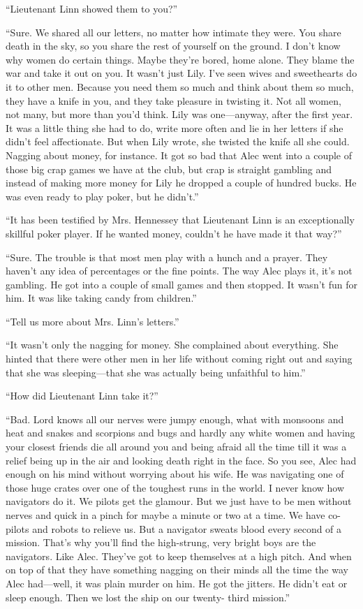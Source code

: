 \documentclass{novel}
\begin{document}
“Lieutenant Linn showed them to you?”

“Sure. We shared all our letters, no matter how intimate they were. You share death in the sky, so you share the rest of yourself on the ground. I don’t know why women do certain things. Maybe they’re bored, home alone. They blame the war and take it out on you. It wasn’t just Lily. I’ve seen wives and sweethearts do it to other men. Because you need them so much and think about them so much, they have a knife in you, and they take pleasure in twisting it. Not all women, not many, but more than you’d think. Lily was one—anyway, after the first year. It was a little thing she had to do, write more often and lie in her letters if she didn’t feel affectionate. But when Lily wrote, she twisted the knife all she could. Nagging about money, for instance. It got so bad that Alec went into a couple of those big crap games we have at the club, but crap is straight gambling and instead of making more money for Lily he dropped a couple of hundred bucks. He was even ready to play poker, but he didn’t.”

“It has been testified by Mrs. Hennessey that Lieutenant Linn is an exceptionally skillful poker player. If he wanted money, couldn’t he have made it that way?”

\scenestars

“Sure. The trouble is that most men play with a hunch and a prayer. They haven’t any idea of percentages or the fine points. The way Alec plays it, it’s not gambling. He got into a couple of small games and then stopped. It wasn’t fun for him. It was like taking candy from children.”

“Tell us more about Mrs. Linn’s letters.”

“It wasn’t only the nagging for money. She complained about everything. She hinted that there were other men in her life without coming right out and saying that she was sleeping—that she was actually being unfaithful to him.”

“How did Lieutenant Linn take it?”

“Bad. Lord knows all our nerves were jumpy enough, what with monsoons and heat and snakes and scorpions and bugs and hardly any white women and having your closest friends die all around you and being afraid all the time till it was a relief being up in the air and looking death right in the face. So you see, Alec had enough on his mind without worrying about his wife. He was navigating one of those huge crates over one of the toughest runs in the world. I never know how navigators do it. We pilots get the glamour. But we just have to be men without nerves and quick in a pinch for maybe a minute or two at a time. We have co-pilots and robots to relieve us. But a navigator sweats blood every second of a mission. That’s why you’ll find the high-strung, very bright boys are the navigators. Like Alec. They’ve got to keep themselves at a high pitch. And when on top of that they have something nagging on their minds all the time the way Alec had—well, it was plain murder on him. He got the jitters. He didn’t eat or sleep enough. Then we lost the ship on our twenty- third mission.”
\end{document}
